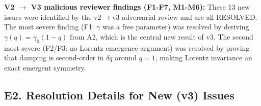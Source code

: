 \documentclass[reprint]{revtex4-2}
\begin{document}
\textbf{V2 $\to$ V3 malicious reviewer findings (F1-F7, M1-M6):} These 13 new issues were identified by the v2$\to$v3 adversarial review and are all RESOLVED. The most severe finding (F1: $\gamma$ was a free parameter) was resolved by deriving $\gamma(q)=\gamma_0(1-q)$ from A2, which is the central new result of v3. The second most severe (F2/F3: no Lorentz emergence argument) was resolved by proving that damping is second-order in $\delta q$ around $q=1$, making Lorentz invariance an exact emergent symmetry.

\subsection{E2. Resolution Details for New (v3) Issues}
\end{document}
